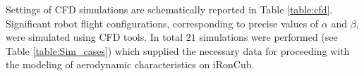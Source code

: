  
Settings of CFD simulations are schematically reported in Table \ref{table:cfd}. Significant robot flight configurations, corresponding to precise values of $\alpha$ and $\beta$, were simulated using CFD tools. In total $21$ simulations were performed (see Table \ref{table:Sim_cases}) which supplied the necessary data for proceeding with the modeling of aerodynamic characteristics on iRonCub.
 
 
